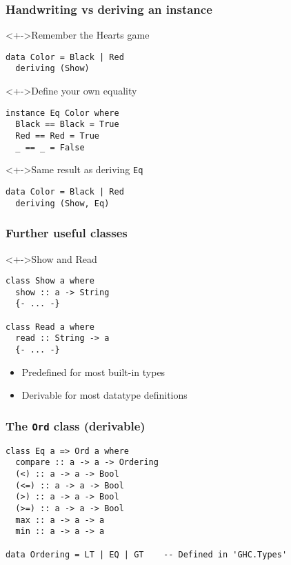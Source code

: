 \documentclass{beamer}
\begin{document}
\begin{frame}[fragile]
  \frametitle{Handwriting vs deriving an instance}
  \begin{block}<+->{Remember the Hearts game}
\begin{lstlisting}
data Color = Black | Red
  deriving (Show)
\end{lstlisting}
  \end{block}
  \begin{block}<+->{Define your own equality}
\begin{lstlisting}
instance Eq Color where
  Black == Black = True
  Red == Red = True
  _ == _ = False
\end{lstlisting}
  \end{block}
  \begin{block}<+->{Same result as deriving \texttt{Eq}}
\begin{lstlisting}
data Color = Black | Red
  deriving (Show, Eq)
\end{lstlisting}
  \end{block}
\end{frame}
\begin{frame}[fragile]
  \frametitle{Further useful classes}
  \begin{block}<+->{Show and Read}
\begin{lstlisting}
class Show a where
  show :: a -> String
  {- ... -}

class Read a where
  read :: String -> a
  {- ... -}
\end{lstlisting}
    \begin{itemize}
    \item Predefined for most built-in types
    \item Derivable for most datatype definitions
    \end{itemize}
  \end{block}
\end{frame}
\begin{frame}[fragile]
  \frametitle{The \texttt{Ord} class (derivable)}
\begin{lstlisting}
class Eq a => Ord a where
  compare :: a -> a -> Ordering
  (<) :: a -> a -> Bool
  (<=) :: a -> a -> Bool
  (>) :: a -> a -> Bool
  (>=) :: a -> a -> Bool
  max :: a -> a -> a
  min :: a -> a -> a

data Ordering = LT | EQ | GT 	-- Defined in 'GHC.Types'
\end{lstlisting}
\end{frame}
\end{document}
